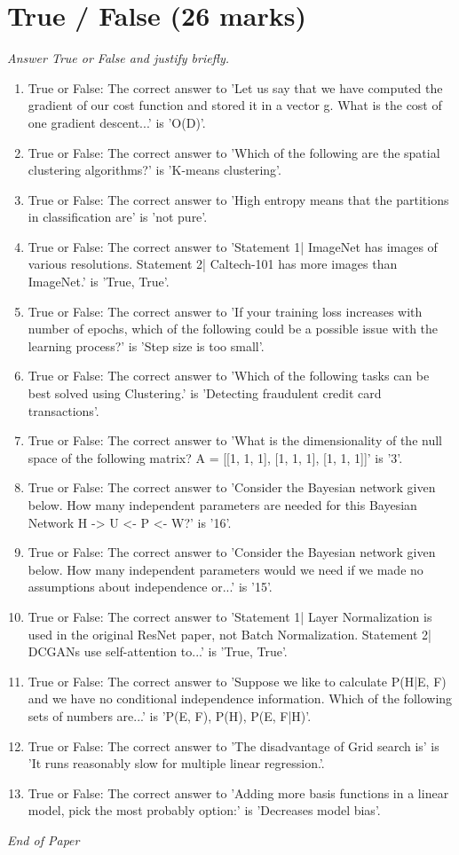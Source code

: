 \documentclass[12pt]{article}
\begin{document}
\section*{True / False (26 marks)}
\textit{Answer True or False and justify briefly.}
\begin{enumerate}[label=\arabic*.]
\item True or False: The correct answer to 'Let us say that we have computed the gradient of our cost function and stored it in a vector g. What is the cost of one gradient descent...' is 'O(D)'.
\item True or False: The correct answer to 'Which of the following are the spatial clustering algorithms?' is 'K-means clustering'.
\item True or False: The correct answer to 'High entropy means that the partitions in classification are' is 'not pure'.
\item True or False: The correct answer to 'Statement 1| ImageNet has images of various resolutions. Statement 2| Caltech-101 has more images than ImageNet.' is 'True, True'.
\item True or False: The correct answer to 'If your training loss increases with number of epochs, which of the following could be a possible issue with the learning process?' is 'Step size is too small'.
\item True or False: The correct answer to 'Which of the following tasks can be best solved using Clustering.' is 'Detecting fraudulent credit card transactions'.
\item True or False: The correct answer to 'What is the dimensionality of the null space of the following matrix? A = [[1, 1, 1], [1, 1, 1], [1, 1, 1]]' is '3'.
\item True or False: The correct answer to 'Consider the Bayesian network given below. How many independent parameters are needed for this Bayesian Network H -> U <- P <- W?' is '16'.
\item True or False: The correct answer to 'Consider the Bayesian network given below. How many independent parameters would we need if we made no assumptions about independence or...' is '15'.
\item True or False: The correct answer to 'Statement 1| Layer Normalization is used in the original ResNet paper, not Batch Normalization. Statement 2| DCGANs use self-attention to...' is 'True, True'.
\item True or False: The correct answer to 'Suppose we like to calculate P(H|E, F) and we have no conditional independence information. Which of the following sets of numbers are...' is 'P(E, F), P(H), P(E, F|H)'.
\item True or False: The correct answer to 'The disadvantage of Grid search is' is 'It runs reasonably slow for multiple linear regression.'.
\item True or False: The correct answer to 'Adding more basis functions in a linear model, pick the most probably option:' is 'Decreases model bias'.
\end{enumerate}

\vfill
\noindent\textit{End of Paper}
\end{document}

